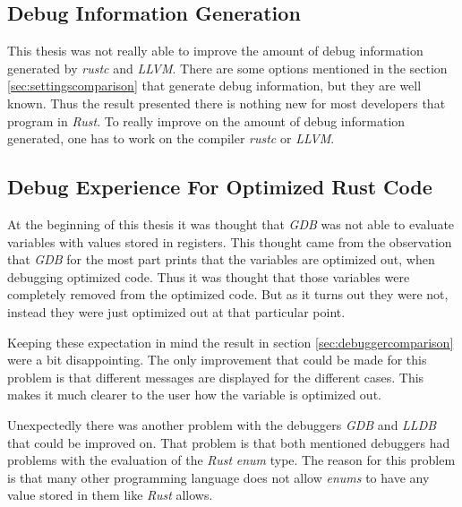 



\subsection{Debug Information Generation}
This thesis was not really able to improve the amount of debug information generated by \emph{rustc} and \emph{LLVM}.
There are some options mentioned in the section \ref{sec:settingscomparison} that generate debug information, but they are well known.
Thus the result presented there is nothing new for most developers that program in \emph{Rust}.
To really improve on the amount of debug information generated, one has to work on the compiler \emph{rustc} or \emph{LLVM}.


\subsection{Debug Experience For Optimized Rust Code}
At the beginning of this thesis it was thought that \emph{GDB} was not able to evaluate variables with values stored in registers.
This thought came from the observation that \emph{GDB} for the most part prints that the variables are optimized out, when debugging optimized code.
Thus it was thought that those variables were completely removed from the optimized code.
But as it turns out they were not, instead they were just optimized out at that particular point.


Keeping these expectation in mind the result in section \ref{sec:debuggercomparison} were a bit disappointing.
The only improvement that could be made for this problem is that different messages are displayed for the different cases.
This makes it much clearer to the user how the variable is optimized out.


Unexpectedly there was another problem with the debuggers \emph{GDB} and \emph{LLDB} that could be improved on.
That problem is that both mentioned debuggers had problems with the evaluation of the \emph{Rust} \emph{enum} type.
The reason for this problem is that many other programming language does not allow \emph{enums} to have any value stored in them like \emph{Rust} allows.


